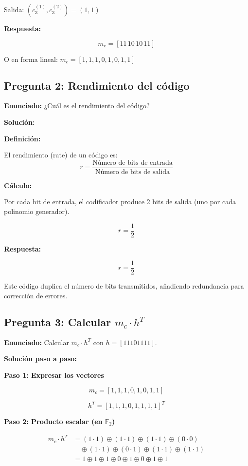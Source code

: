 \documentclass[11pt,a4paper]{article}
\begin{document}
Salida: $(c_3^{(1)}, c_3^{(2)}) = (1, 1)$

\textbf{Respuesta:}

\[
\boxed{m_c = [11 \, 10 \, 10 \, 11]}
\]

O en forma lineal: $m_c = [1, 1, 1, 0, 1, 0, 1, 1]$

\subsection*{Pregunta 2: Rendimiento del c\'odigo}

\textbf{Enunciado:} ¿Cu\'al es el rendimiento del c\'odigo?

\vspace{0.3cm}
\textbf{Soluci\'on:}

\textbf{Definici\'on:}

El rendimiento (rate) de un c\'odigo es:
\[
r = \frac{\text{N\'umero de bits de entrada}}{\text{N\'umero de bits de salida}}
\]

\textbf{C\'alculo:}

Por cada bit de entrada, el codificador produce 2 bits de salida (uno por cada polinomio generador).

\[
r = \frac{1}{2}
\]

\textbf{Respuesta:}

\[
\boxed{r = \frac{1}{2}}
\]

Este c\'odigo duplica el n\'umero de bits transmitidos, a\~nadiendo redundancia para correcci\'on de errores.

\subsection*{Pregunta 3: Calcular $m_c \cdot h^T$}

\textbf{Enunciado:} Calcular $m_c \cdot h^T$ con $h = [11101111]$.

\vspace{0.3cm}
\textbf{Soluci\'on paso a paso:}

\textbf{Paso 1: Expresar los vectores}

\[
m_c = [1, 1, 1, 0, 1, 0, 1, 1]
\]

\[
h^T = [1, 1, 1, 0, 1, 1, 1, 1]^T
\]

\textbf{Paso 2: Producto escalar (en $\mathbb{F}_2$)}

\begin{align*}
m_c \cdot h^T &= (1 \cdot 1) \oplus (1 \cdot 1) \oplus (1 \cdot 1) \oplus (0 \cdot 0) \\
&\quad \oplus (1 \cdot 1) \oplus (0 \cdot 1) \oplus (1 \cdot 1) \oplus (1 \cdot 1) \\
&= 1 \oplus 1 \oplus 1 \oplus 0 \oplus 1 \oplus 0 \oplus 1 \oplus 1
\end{align*}
\end{document}
